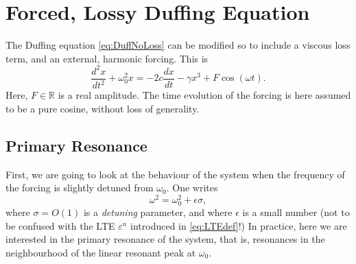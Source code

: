 \documentclass[11pt,twoside,a4paper,english]{book}
\begin{document}
\section{Forced, Lossy Duffing Equation}\label{sec:ForcedDuffing}


The Duffing equation \eqref{eq:DuffNoLoss} can be modified so to include a viscous loss term, and an external, harmonic forcing. This is 
\begin{equation}\label{eq:DuffForced}
\frac{d^2 x}{dt^2} + \omega_0^2 x = - 2c \frac{dx}{dt} - \gamma x^3 + F \cos(\omega t).
\end{equation}
Here, $F \in \mathbb{R}$ is a real amplitude. The time evolution of the forcing is here assumed to be a pure cosine, without loss of generality. 


\subsection{Primary Resonance}
First, we are going to look at the behaviour of the system when the frequency of the forcing is slightly detuned from $\omega_0$. One writes
\begin{equation}\label{eq:omDefDuff}
\omega^2 = \omega_0^2 + \epsilon \sigma,
\end{equation}
where $\sigma = O(1)$ is a \emph{detuning} parameter, and where $\epsilon$ is a small number (not to be confused with the LTE $\varepsilon^n$ introduced in \eqref{eq:LTEdef}!) In practice, here we are interested in the primary resonance of the system, that is, resonances in the neighbourhood of the linear resonant peak at $\omega_0$. 
\end{document}
